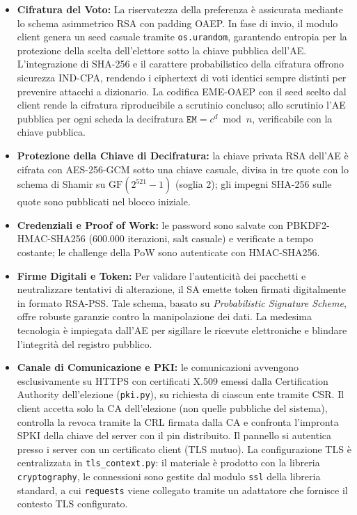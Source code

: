\documentclass[12pt,a4paper]{article}
\begin{document}
\begin{itemize}
  \item \textbf{Cifratura del Voto:} La riservatezza della preferenza è assicurata mediante lo schema asimmetrico RSA con padding OAEP. In fase di invio, il modulo client genera un seed casuale tramite \texttt{os.urandom}, garantendo entropia per la protezione della scelta dell'elettore sotto la chiave pubblica dell'AE. L'integrazione di SHA-256 e il carattere probabilistico della cifratura offrono sicurezza IND-CPA, rendendo i ciphertext di voti identici sempre distinti per prevenire attacchi a dizionario. La codifica EME-OAEP con il seed scelto dal client rende la cifratura riproducibile a scrutinio concluso; allo scrutinio l'AE pubblica per ogni scheda la decifratura $\mathtt{EM} = c^{d} \bmod n$, verificabile con la chiave pubblica.
  \item \textbf{Protezione della Chiave di Decifratura:} la chiave privata RSA dell'AE è cifrata con AES-256-GCM sotto una chiave casuale, divisa in tre quote con lo schema di Shamir su $\mathrm{GF}(2^{521}-1)$ (soglia 2); gli impegni SHA-256 sulle quote sono pubblicati nel blocco iniziale.
  \item \textbf{Credenziali e Proof of Work:} le password sono salvate con PBKDF2-HMAC-SHA256 (600.000 iterazioni, salt casuale) e verificate a tempo costante; le challenge della PoW sono autenticate con HMAC-SHA256.
  \item \textbf{Firme Digitali e Token:} Per validare l'autenticità dei pacchetti e neutralizzare tentativi di alterazione, il SA emette token firmati digitalmente in formato RSA-PSS. Tale schema, basato su \textit{Probabilistic Signature Scheme}, offre robuste garanzie contro la manipolazione dei dati. La medesima tecnologia è impiegata dall'AE per sigillare le ricevute elettroniche e blindare l'integrità del registro pubblico.
  \item \textbf{Canale di Comunicazione e PKI:} le comunicazioni avvengono esclusivamente su HTTPS con certificati X.509 emessi dalla Certification Authority dell'elezione (\texttt{pki.py}), su richiesta di ciascun ente tramite CSR. Il client accetta solo la CA dell'elezione (non quelle pubbliche del sistema), controlla la revoca tramite la CRL firmata dalla CA e confronta l'impronta SPKI della chiave del server con il pin distribuito. Il pannello si autentica presso i server con un certificato client (TLS mutuo). La configurazione TLS è centralizzata in \texttt{tls\_context.py}: il materiale è prodotto con la libreria \texttt{cryptography}, le connessioni sono gestite dal modulo \texttt{ssl} della libreria standard, a cui \texttt{requests} viene collegato tramite un adattatore che fornisce il contesto TLS configurato.
\end{itemize}
\end{document}
